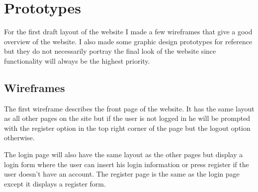 \documentclass[paper=a4, fontsize=11pt]{scrartcl} %
\numberwithin{equation}{section} %
\numberwithin{figure}{section} %
\numberwithin{table}{section} %
\begin{document}
\section{Prototypes}
For the first draft layout of the website I made a few wireframes that give a good overview of the website. I also made some graphic design prototypes for reference but they do not necessarily portray the final look of the website since functionality will always be the highest priority.
\subsection{Wireframes}
The first wireframe describes the front page of the website. It has the same layout as all other pages on the site but if the user is not logged in he will be prompted with the register option in the top right corner of the page but the logout option otherwise.
\begin{center}
\end{center}
The login page will also have the same layout as the other pages but display a login form where the user can insert his login information or press register if the user doesn’t have an account. The register page is the same as the login page except it displays a register form.
\begin{center}
\end{center}
\end{document}
